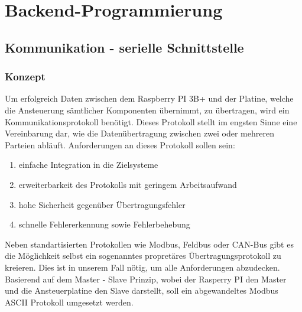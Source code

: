 \section{Backend-Programmierung}\label{sec:backend-programmierung}
\subsection{Kommunikation - serielle Schnittstelle}\label{subsec:kommunikation---serielle-schnittstelle}
\subsubsection{Konzept}
Um erfolgreich Daten zwischen dem Raspberry PI 3B+ und der Platine, welche die Ansteuerung sämtlicher Komponenten übernimmt, zu übertragen, wird ein Kommunikationsprotokoll benötigt.
Dieses Protokoll stellt im engsten Sinne eine Vereinbarung dar, wie die Datenübertragung zwischen zwei oder mehreren Parteien abläuft.
Anforderungen an dieses Protokoll sollen sein:
\begin{enumerate}
    \item einfache Integration in die Zielsysteme
    \item erweiterbarkeit des Protokolls mit geringem Arbeitsaufwand
    \item hohe Sicherheit gegenüber Übertragungsfehler
    \item schnelle Fehlererkennung sowie Fehlerbehebung
\end{enumerate}
Neben standartisierten Protokollen wie Modbus, Feldbus oder CAN-Bus gibt es die Möglichkeit selbst ein sogenanntes propretäres Übertragungsprotokoll zu kreieren.
Dies ist in unserem Fall nötig, um alle Anforderungen abzudecken.
Basierend auf dem Master - Slave Prinzip, wobei der Rasperry PI den Master und die Ansteuerplatine den Slave darstellt, soll ein abgewandeltes Modbus ASCII Protokoll umgesetzt werden.


